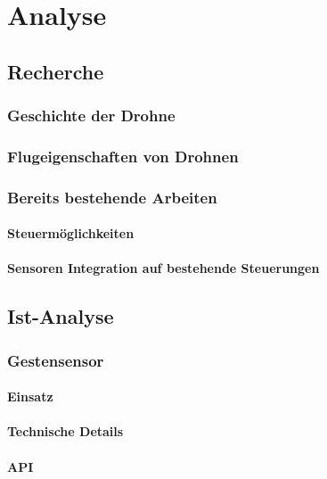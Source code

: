 \chapter{Analyse}

\section{Recherche}

\subsection{Geschichte der Drohne}


\subsection{Flugeigenschaften von Drohnen}


\subsection{Bereits bestehende Arbeiten}

\subsubsection{Steuermöglichkeiten}

\subsubsection{Sensoren Integration auf bestehende Steuerungen}


\section{Ist-Analyse}
\subsection{Gestensensor}

\subsubsection{Einsatz}

\subsubsection{Technische Details}

\subsubsection{API}


